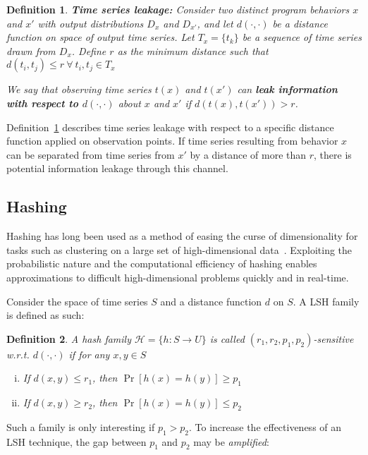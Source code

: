 \documentclass[a4paper]{article}
\newtheorem{definition}{Definition}
\begin{document}
\begin{definition}\label{defn:leakage}
	\textbf{Time series leakage:} Consider two distinct program behaviors $x$ and $x'$ with output distributions $D_x$ and $D_{x'}$, and let $d(\cdot,\cdot)$ be a distance function on space of output time series.
    Let $T_x = \{t_k\}$ be a sequence of time series drawn from $D_x$.
    Define $r$ as the minimum distance such that $d(t_i, t_j) \le r~\forall~t_i,t_j \in T_x$

    We say that observing time series $t(x)$ and $t(x')$ can \textbf{leak information with respect to $d(\cdot,\cdot)$} about $x$ and $x'$ if $d(t(x),t(x')) > r$.
\end{definition}

Definition~\ref{defn:leakage} describes time series leakage with respect to a specific distance function applied on observation points.
If time series resulting from behavior $x$ can be separated from time series from $x'$ by a distance of more than $r$, there is potential information leakage through this channel.

\subsection{Hashing}
\label{subsec:hashing}
Hashing has long been used as a method of easing the curse of dimensionality for tasks such as clustering on a large set of high-dimensional data~\cite{Indyk98-ANN,Gionis99-SSH,Datar04-LSH}.
Exploiting the probabilistic nature and the computational efficiency of hashing enables approximations to difficult high-dimensional problems quickly and in real-time.

Consider the space of time series $S$ and a distance function $d$ on $S$.
A LSH family is defined as such:

\begin{definition}\label{def:hash_family}
    A hash family $\mathcal{H} = \{ h : S \rightarrow U \}$ is called $(r_1, r_2, p_1, p_2)$-sensitive w.r.t. $d(\cdot,\cdot)$ if for any $x,y \in S$
    \begin{enumerate}[(i)]
        \item\label{itm:hash_def1} If $d(x,y) \le r_1$, then $\Pr[h(x) = h(y)] \ge p_1$
        \item\label{itm:hash_def2} If $d(x,y) \ge r_2$, then $\Pr[h(x) = h(y)] \le p_2$
    \end{enumerate}
\end{definition}

Such a family is only interesting if $p_1 > p_2$.
To increase the effectiveness of an LSH technique, the gap between $p_1$ and $p_2$ may be \textit{amplified}:
\end{document}
